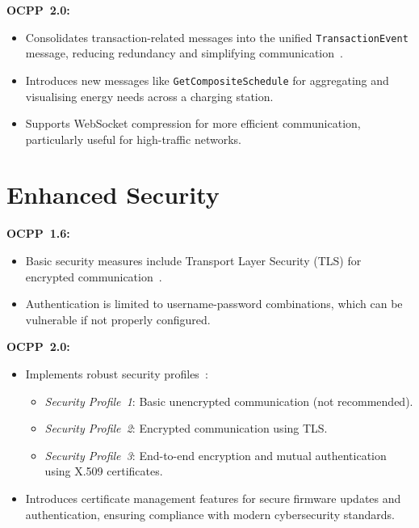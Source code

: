 \documentclass[12pt,a4paper]{report}
\begin{document}
\textbf{OCPP~2.0:}
\begin{itemize}
  \item Consolidates transaction-related messages into the unified \texttt{TransactionEvent}
        message, reducing redundancy and simplifying communication~\autocite{ocpp201}.
  \item Introduces new messages like \texttt{GetCompositeSchedule} for aggregating and
        visualising energy needs across a charging station.
  \item Supports WebSocket compression for more efficient communication, particularly useful
        for high-traffic networks.
\end{itemize}

\section{Enhanced Security}

\textbf{OCPP~1.6:}
\begin{itemize}
  \item Basic security measures include Transport Layer Security (TLS) for encrypted
        communication~\autocite{ocpp16_ed2}.
  \item Authentication is limited to username-password combinations, which can be vulnerable
        if not properly configured.
\end{itemize}

\textbf{OCPP~2.0:}
\begin{itemize}
  \item Implements robust security profiles~\autocite{ocpp201}:
        \begin{itemize}
          \item \textit{Security Profile~1}: Basic unencrypted communication (not recommended).
          \item \textit{Security Profile~2}: Encrypted communication using TLS.
          \item \textit{Security Profile~3}: End-to-end encryption and mutual authentication
                using X.509 certificates.
        \end{itemize}
  \item Introduces certificate management features for secure firmware updates and
        authentication, ensuring compliance with modern cybersecurity standards.
\end{itemize}

\end{document}
